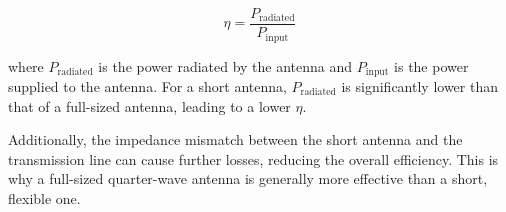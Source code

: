 \[
\eta = \frac{P_{\text{radiated}}}{P_{\text{input}}}
\]

where $P_{\text{radiated}}$ is the power radiated by the antenna and $P_{\text{input}}$ is the power supplied to the antenna. For a short antenna, $P_{\text{radiated}}$ is significantly lower than that of a full-sized antenna, leading to a lower $\eta$.

Additionally, the impedance mismatch between the short antenna and the transmission line can cause further losses, reducing the overall efficiency. This is why a full-sized quarter-wave antenna is generally more effective than a short, flexible one.

